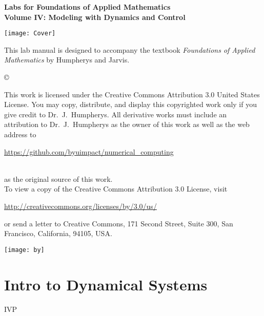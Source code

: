 \documentclass[nociteref]{SIAM-GH-book}
\begin{document}
\thispagestyle{empty}
\begin{center}
{\huge \bf Labs for Foundations of Applied Mathematics} \\
\vspace{5mm}
{\Large \bf Volume IV: Modeling with
Dynamics and Control}
\vspace{20mm}

\texttt{[image: Cover]}
\end{center}
\frontmatter




\begin{thepreface}
This lab manual is designed to accompany the textbook \emph{Foundations of Applied Mathematics} by Humpherys and Jarvis.

\vfill
\copyright{This work is licensed under the Creative Commons Attribution 3.0 United States 
License.  You may copy, distribute, and display this copyrighted work only if you give 
credit to Dr.~J.~Humpherys. All derivative works must include an attribution to Dr.~J.~Humpherys as the owner of this work as well as the web address to 
\\\centerline{\url{https://github.com/byuimpact/numerical_computing}}\\ as the original source of 
this 
work.\\To view a copy of the Creative Commons Attribution 3.0 License, 
visit\\\centerline{\url{http://creativecommons.org/licenses/by/3.0/us/}} or send a letter to 
Creative Commons, 171 Second Street, Suite 300, San Francisco, California, 94105, USA.}

\vfill
\centering\texttt{[image: by]}
\vfill
\end{thepreface}

\setcounter{tocdepth}{1}
\tableofcontents

\mainmatter


\part{Intro to Dynamical Systems}
{IVP}
\end{document}
